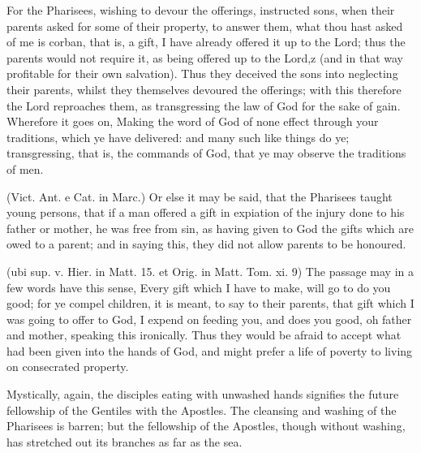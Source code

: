  For the Pharisees, wishing to devour the offerings, instructed sons, when their parents asked for some of their property, to answer them, what thou hast asked of me is corban, that is, a gift, I have already offered it up to the Lord; thus the parents would not require it, as being offered up to the Lord,z (and in that way profitable for their own salvation). Thus they deceived the sons into neglecting their parents, whilst they themselves devoured the offerings; with this therefore the Lord reproaches them, as transgressing the law of God for the sake of gain. Wherefore it goes on, Making the word of God of none effect through your traditions, which ye have delivered: and many such like things do ye; transgressing, that is, the commands of God, that ye may observe the traditions of men.

 (Vict. Ant. e Cat. in Marc.) Or else it may be said, that the Pharisees taught young persons, that if a man offered a gift in expiation of the injury done to his father or mother, he was free from sin, as having given to God the gifts which are owed to a parent; and in saying this, they did not allow parents to be honoured.

 (ubi sup. v. Hier. in Matt. 15. et Orig. in Matt. Tom. xi. 9) The passage may in a few words have this sense, Every gift which I have to make, will go to do you good; for ye compel children, it is meant, to say to their parents, that gift which I was going to offer to God, I expend on feeding you, and does you good, oh father and mother, speaking this ironically. Thus they would be afraid to accept what had been given into the hands of God, and might prefer a life of poverty to living on consecrated property.

 Mystically, again, the disciples eating with unwashed hands signifies the future fellowship of the Gentiles with the Apostles. The cleansing and washing of the Pharisees is barren; but the fellowship of the Apostles, though without washing, has stretched out its branches as far as the sea.

 


